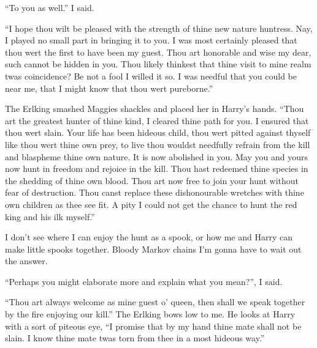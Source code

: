 ``To you as well.'' I said.
	
	``I hope thou wilt be pleased with the strength of thine new nature huntress. Nay, I played no small part in bringing it to you. I was most certainly pleased that thou wert the first to have been my guest. Thou art honorable and wise my dear, such cannot be hidden in you. Thou likely thinkest that thine visit to mine realm twas coincidence? Be not a fool I willed it so. I was needful that you could be near me, that I might know that thou wert pureborne.''

	The Erlking smashed Maggies shackles and placed her in Harry's hands. ``Thou art the greatest hunter of thine kind, I cleared thine path for you. I ensured that thou wert slain. Your life has been hideous child, thou wert pitted against thyself like thou wert thine own prey, to live thou wouldst needfully refrain from the kill and blaspheme thine own nature. It is now abolished in you. May you and yours now hunt in freedom and rejoice in the kill. Thou hast redeemed thine species in the shedding of thine own blood. Thou art now free to join your hunt without fear of destruction. Thou canst replace these dishonourable wretches with thine own children as thee see fit. A pity I could not get the chance to hunt the red king and his ilk myself.''
	
	I don't see where I can enjoy the hunt as a spook, or how me and Harry can make little spooks together. Bloody Markov chains I'm gonna have to wait out the answer.

``Perhaps you might elaborate more and explain what you mean?'', I said.
	
	``Thou art always welcome as mine guest o' queen, then shall we speak together by the fire enjoying our kill.'' The Erlking bows low to me. He looks at Harry with a sort of piteous eye, ``I promise that by my hand thine mate shall not be slain. I know thine mate twas torn from thee in a most hideous way.''\\

